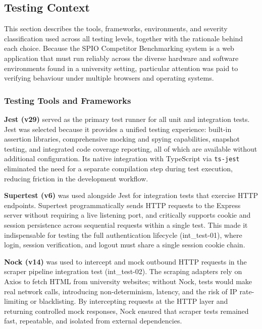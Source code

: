 \subsection{Testing Context}

This section describes the tools, frameworks, environments, and severity classification used across all testing levels, together with the rationale behind each choice. Because the SPIO Competitor Benchmarking system is a web application that must run reliably across the diverse hardware and software environments found in a university setting, particular attention was paid to verifying behaviour under multiple browsers and operating systems.

\subsubsection*{Testing Tools and Frameworks}

\textbf{Jest (v29)} served as the primary test runner for all unit and integration tests. Jest was selected because it provides a unified testing experience: built-in assertion libraries, comprehensive mocking and spying capabilities, snapshot testing, and integrated code coverage reporting, all of which are available without additional configuration. Its native integration with TypeScript via \texttt{ts-jest} eliminated the need for a separate compilation step during test execution, reducing friction in the development workflow.

\textbf{Supertest (v6)} was used alongside Jest for integration tests that exercise HTTP endpoints. Supertest programmatically sends HTTP requests to the Express server without requiring a live listening port, and critically supports cookie and session persistence across sequential requests within a single test. This made it indispensable for testing the full authentication lifecycle (int\_test-01), where login, session verification, and logout must share a single session cookie chain.

\textbf{Nock (v14)} was used to intercept and mock outbound HTTP requests in the scraper pipeline integration test (int\_test-02). The scraping adapters rely on Axios to fetch HTML from university websites; without Nock, tests would make real network calls, introducing non-determinism, latency, and the risk of IP rate-limiting or blacklisting. By intercepting requests at the HTTP layer and returning controlled mock responses, Nock ensured that scraper tests remained fast, repeatable, and isolated from external dependencies.

